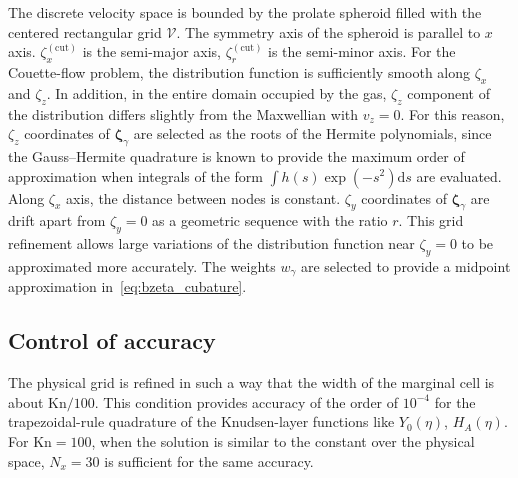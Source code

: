 \documentclass[]{elsarticle} %
\newcommand{\Kn}{\mathrm{Kn}}
\newcommand{\dd}{\mathrm{d}}
\newcommand{\bzeta}{\boldsymbol{\zeta}}
\begin{document}
The discrete velocity space is bounded by the prolate spheroid
filled with the centered rectangular grid \(\mathcal{V}\).
The symmetry axis of the spheroid is parallel to \(x\) axis.
\(\zeta^{(\mathrm{cut})}_x\) is the semi-major axis, \(\zeta^{(\mathrm{cut})}_r\) is the semi-minor axis.
For the Couette-flow problem, the distribution function is sufficiently smooth along \(\zeta_x\) and \(\zeta_z\).
In addition, in the entire domain occupied by the gas, \(\zeta_z\) component of the distribution
differs slightly from the Maxwellian with \(v_z=0\).
For this reason, \(\zeta_z\) coordinates of \(\bzeta_\gamma\) are selected as the roots of the Hermite polynomials,
since the Gauss--Hermite quadrature is known to provide the maximum order of approximation
when integrals of the form \(\int h(s)\exp(-s^2)\dd{s}\) are evaluated.
Along \(\zeta_x\) axis, the distance between nodes is constant.
\(\zeta_y\) coordinates of \(\bzeta_\gamma\) are drift apart from \(\zeta_y=0\)
as a geometric sequence with the ratio \(r\).
This grid refinement allows large variations of the distribution function
near \(\zeta_y=0\) to be approximated more accurately.
The weights \(w_\gamma\) are selected to provide a midpoint approximation in~\eqref{eq:bzeta_cubature}.

\subsection{Control of accuracy}

The physical grid is refined in such a way
that the width of the marginal cell is about \(\Kn/100\).
This condition provides accuracy of the order of \(10^{-4}\) for the trapezoidal-rule quadrature
of the Knudsen-layer functions like \(Y_0(\eta)\), \(H_A(\eta)\).
For \(\Kn=100\), when the solution is similar to the constant over the physical space,
\(N_x = 30\) is sufficient for the same accuracy.
\end{document}
